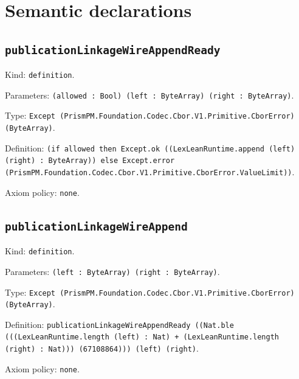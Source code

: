 \documentclass[11pt]{article}
\begin{document}
\section*{Semantic declarations}
\subsection*{\texttt{publicationLinkageWireAppendReady}}
\noindent Kind: \texttt{definition}.\par
\noindent Parameters: \texttt{(allowed : Bool) (left : ByteArray) (right : ByteArray)}.\par
\noindent Type: \texttt{Except (PrismPM.Foundation.Codec.Cbor.V1.Primitive.CborError) (ByteArray)}.\par
\noindent Definition: \texttt{(if allowed then Except.ok ((LexLeanRuntime.append (left) (right) : ByteArray)) else Except.error (PrismPM.Foundation.Codec.Cbor.V1.Primitive.CborError.ValueLimit))}.\par
\noindent Axiom policy: \texttt{none}.\par
\subsection*{\texttt{publicationLinkageWireAppend}}
\noindent Kind: \texttt{definition}.\par
\noindent Parameters: \texttt{(left : ByteArray) (right : ByteArray)}.\par
\noindent Type: \texttt{Except (PrismPM.Foundation.Codec.Cbor.V1.Primitive.CborError) (ByteArray)}.\par
\noindent Definition: \texttt{publicationLinkageWireAppendReady ((Nat.ble (((LexLeanRuntime.length (left) : Nat) + (LexLeanRuntime.length (right) : Nat))) (67108864))) (left) (right)}.\par
\noindent Axiom policy: \texttt{none}.\par
\end{document}
